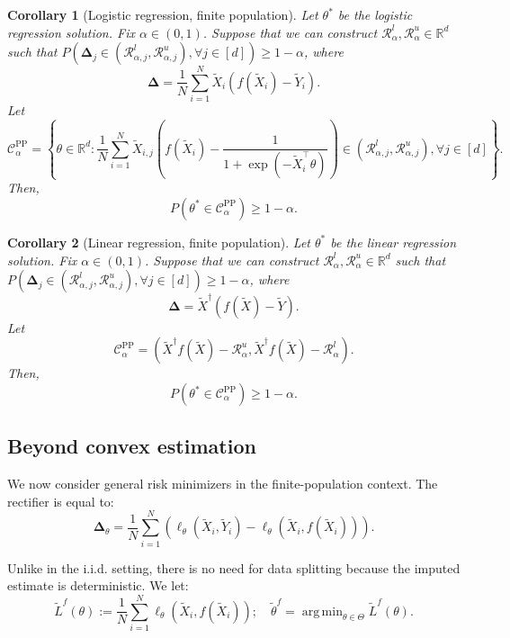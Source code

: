 \documentclass[10pt]{article}
\newtheorem{cor}{Corollary} %
\def\R{\mathbb{R}}
\newcommand{\cR}{\mathcal{R}}
\newcommand{\Xt}{\widetilde{X}}
\newcommand{\Yt}{\widetilde{Y}}
\newcommand{\thetaf}{\tilde{\theta}^{f}}
\newcommand{\rec}{\mathbf{\Delta}}
\newcommand{\CPP}{\mathcal{C}^{\mathrm{PP}}}
\DeclareMathOperator*{\argmin}{arg\,min}
\begin{document}
\begin{cor}[Logistic regression, finite population]
\label{cor:logistic-valid-finite-pop}
Let $\theta^*$ be the logistic regression solution. Fix $\alpha\in(0,1)$. Suppose that we can construct $\cR_\alpha^l, \cR_\alpha^u\in\R^d$ such that $P(\rec_j \in (\cR_{\alpha,j}^l, \cR_{\alpha,j}^u), \forall j\in[d]) \geq 1-\alpha$, where
$$\rec = 
\frac 1 N \sum_{i=1}^N \Xt_{i} (f(\Xt_i) - \Yt_i).$$
Let
$$\CPP_\alpha = \left\{\theta \in \R^d: \frac{1}{N}\sum_{i=1}^N \Xt_{i,j} \left(f(\Xt_i) - \frac{1}{1+\exp(-\Xt_i^\top \theta)}  \right) \in \left(\cR_{\alpha,j}^l , \cR_{\alpha,j}^u \right), \forall j\in[d] \right\}.$$
Then,
\begin{equation}
    P( \theta^* \in \CPP_\alpha ) \geq 1-\alpha.
\end{equation}
\end{cor}

\begin{cor}[Linear regression, finite population]
\label{cor:ols-valid-finite-pop}
Let $\theta^*$ be the linear regression solution. Fix $\alpha\in(0,1)$. Suppose that we can construct $\cR_\alpha^l, \cR_\alpha^u\in\R^d$ such that $P(\rec_j \in (\cR_{\alpha,j}^l, \cR_{\alpha,j}^u), \forall j \in[d]) \geq 1-\alpha$, where
$$\rec = \Xt^\dagger (f(\Xt)-\Yt).$$
Let
$$\CPP_\alpha = \left(\Xt^\dagger f(\Xt) - \cR_{\alpha}^u, \Xt^\dagger f(\Xt)  - \cR_{\alpha}^l\right).$$
Then,
\begin{equation}
    P( \theta^* \in \CPP_\alpha ) \geq 1-\alpha.
\end{equation}
\end{cor}


\subsection{Beyond convex estimation}

We now consider general risk minimizers in the finite-population context. The rectifier is equal to:
\begin{equation}
\rec_{\theta} =   \frac{1}{N}\sum_{i=1}^N \left( \ell_\theta(\tilde X_i, \tilde Y_i) -  \ell_\theta(\tilde X_i, f(\Xt_i)) \right).
\end{equation}


Unlike in the i.i.d. setting, there is no need for data splitting because the imputed estimate is deterministic. We let:
$$\tilde L^f(\theta) := \frac{1}{N} \sum_{i=1}^{N} \ell_\theta(\tilde X_i,  f(\Xt_i)); \quad \thetaf = \argmin_{\theta\in\Theta} \tilde L^f(\theta).$$
\end{document}
